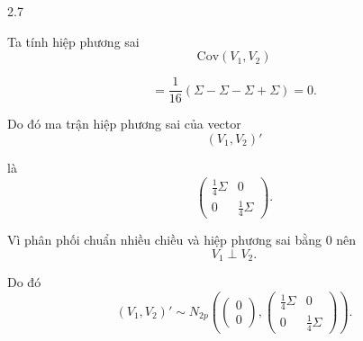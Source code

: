 \begin{question}{2.7}
\begin{subquestion}
\begin{answer}
Ta tính hiệp phương sai
\[
\mathrm{Cov}(V_1,V_2)
\]

\[
=\frac{1}{16}(\Sigma-\Sigma-\Sigma+\Sigma)=0.
\]

Do đó ma trận hiệp phương sai của vector
\[
(V_1,V_2)'
\]

là
\[
\begin{pmatrix}
\frac{1}{4}\Sigma & 0 \\
0 & \frac{1}{4}\Sigma
\end{pmatrix}.
\]

Vì phân phối chuẩn nhiều chiều và hiệp phương sai bằng $0$ nên
\[
V_1 \perp V_2 .
\]

Do đó
\[
(V_1,V_2)' \sim
N_{2p}
\left(
\begin{pmatrix}
0\\
0
\end{pmatrix},
\begin{pmatrix}
\frac{1}{4}\Sigma & 0\\
0 & \frac{1}{4}\Sigma
\end{pmatrix}
\right).
\]
\end{answer}
\end{subquestion}

\end{question}
